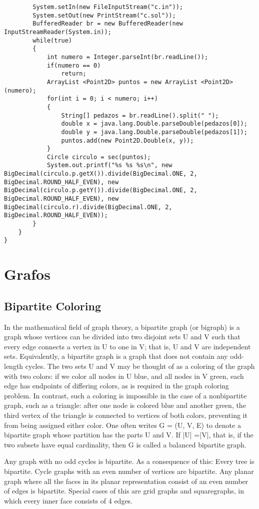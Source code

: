 \documentclass[a4paper, 11pt, oneside]{report}
\begin{document}
\begin{verbatim}
		System.setIn(new FileInputStream("c.in"));
		System.setOut(new PrintStream("c.sol"));
		BufferedReader br = new BufferedReader(new InputStreamReader(System.in));
		while(true)
		{
			int numero = Integer.parseInt(br.readLine());
			if(numero == 0)
				return;
			ArrayList <Point2D> puntos = new ArrayList <Point2D> (numero);
			for(int i = 0; i < numero; i++)
			{
				String[] pedazos = br.readLine().split(" ");
				double x = java.lang.Double.parseDouble(pedazos[0]);
				double y = java.lang.Double.parseDouble(pedazos[1]);
				puntos.add(new Point2D.Double(x, y));
			}
			Circle circulo = sec(puntos);
			System.out.printf("%s %s %s\n", new BigDecimal(circulo.p.getX()).divide(BigDecimal.ONE, 2, BigDecimal.ROUND_HALF_EVEN), new BigDecimal(circulo.p.getY()).divide(BigDecimal.ONE, 2, BigDecimal.ROUND_HALF_EVEN), new BigDecimal(circulo.r).divide(BigDecimal.ONE, 2, BigDecimal.ROUND_HALF_EVEN));
		}
	}
}

\end{verbatim}

\chapter{Grafos}

\section{Bipartite Coloring}

In the mathematical field of graph theory, a bipartite graph (or bigraph) is a graph whose vertices can be divided into two disjoint sets U and V such that every edge connects a vertex in U to one in V; that is, U and V are independent sets. Equivalently, a bipartite graph is a graph that does not contain any odd-length cycles.
The two sets U and V may be thought of as a coloring of the graph with two colors: if we color all nodes in U blue, and all nodes in V green, each edge has endpoints of differing colors, as is required in the graph coloring problem. In contrast, such a coloring is impossible in the case of a nonbipartite graph, such as a triangle: after one node is colored blue and another green, the third vertex of the triangle is connected to vertices of both colors, preventing it from being assigned either color.
One often writes G = (U, V, E) to denote a bipartite graph whose partition has the parts U and V. If |U| =|V|, that is, if the two subsets have equal cardinality, then G is called a balanced bipartite graph.

Any graph with no odd cycles is bipartite. As a consequence of this:
Every tree is bipartite.
Cycle graphs with an even number of vertices are bipartite.
Any planar graph where all the faces in its planar representation consist of an even number of edges is bipartite. Special cases of this are grid graphs and squaregraphs, in which every inner face consists of 4 edges.
\end{document}
